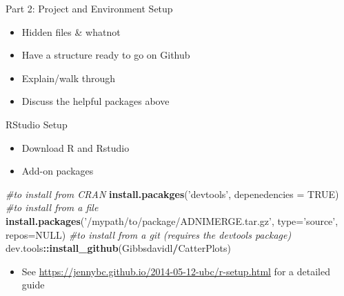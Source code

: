 \documentclass[
  ignorenonframetext,
]{beamer}
\newenvironment{Shaded}{\begin{snugshade}}{\end{snugshade}}
\newcommand{\CommentTok}[1]{\textcolor[rgb]{0.56,0.35,0.01}{\textit{#1}}}
\newcommand{\DataTypeTok}[1]{\textcolor[rgb]{0.13,0.29,0.53}{#1}}
\newcommand{\KeywordTok}[1]{\textcolor[rgb]{0.13,0.29,0.53}{\textbf{#1}}}
\newcommand{\NormalTok}[1]{#1}
\newcommand{\OperatorTok}[1]{\textcolor[rgb]{0.81,0.36,0.00}{\textbf{#1}}}
\newcommand{\OtherTok}[1]{\textcolor[rgb]{0.56,0.35,0.01}{#1}}
\newcommand{\StringTok}[1]{\textcolor[rgb]{0.31,0.60,0.02}{#1}}
\providecommand{\tightlist}{%
  \setlength{\itemsep}{0pt}\setlength{\parskip}{0pt}}
\begin{document}
\begin{frame}{Part 2: Project and Environment Setup}
\protect\hypertarget{part-2-project-and-environment-setup}{}

\begin{itemize}
\tightlist
\item
  Hidden files \& whatnot
\item
  Have a structure ready to go on Github
\item
  Explain/walk through
\item
  Discuss the helpful packages above
\end{itemize}

\end{frame}

\begin{frame}[fragile]{RStudio Setup}
\protect\hypertarget{rstudio-setup}{}

\begin{itemize}
\tightlist
\item
  Download R and Rstudio
\item
  Add-on packages
\end{itemize}

\begin{Shaded}
\begin{Highlighting}[]
\CommentTok{#to install from CRAN}
\KeywordTok{install.pacakges}\NormalTok{(}\StringTok{'devtools'}\NormalTok{, }\DataTypeTok{depenedencies =} \OtherTok{TRUE}\NormalTok{)}
\CommentTok{#to install from a file}
\KeywordTok{install.packages}\NormalTok{(}\StringTok{'/mypath/to/package/ADNIMERGE.tar.gz'}\NormalTok{, }
                 \DataTypeTok{type=}\StringTok{'source'}\NormalTok{, }\DataTypeTok{repos=}\OtherTok{NULL}\NormalTok{) }
\CommentTok{#to install from a git  (requires the devtools package)}
\NormalTok{dev.tools}\OperatorTok{::}\KeywordTok{install_github}\NormalTok{(Gibbsdavidl}\OperatorTok{/}\NormalTok{CatterPlots) }
\end{Highlighting}
\end{Shaded}

\begin{itemize}
\tightlist
\item
  See \url{https://jennybc.github.io/2014-05-12-ubc/r-setup.html} for a
  detailed guide
\end{itemize}

\end{frame}
\end{document}
